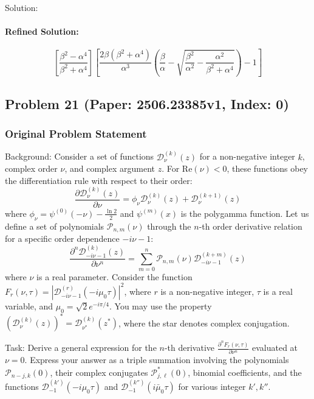 \documentclass[10pt]{article}
\begin{document}
Solution:

\paragraph*{Refined Solution:}
\[ \left[\frac{\beta^2 - \alpha^4}{\beta^2 + \alpha^4}\right] \left[ \frac{2\beta(\beta^2 + \alpha^4)}{\alpha^3}\left(\frac{\beta}{\alpha} - \sqrt{\frac{\beta^2}{\alpha^2} - \frac{\alpha^2}{\beta^2 + \alpha^4}} \right) - 1\right] \]

\newpage
\subsection*{Problem 21 (Paper: 2506.23385v1, Index: 0)}

\subsubsection*{Original Problem Statement}
Background:
Consider a set of functions $\mathcal{D}^{\left(k\right)}_{\nu}\left(z\right)$ for a non-negative integer $k$, complex order $\nu$, and complex argument $z$. For $\mathrm{Re}(\nu) < 0$, these functions obey the differentiation rule with respect to their order:
$$ \frac{\partial \mathcal{D}^{\left(k\right)}_{\nu}\left(z\right)}{\partial \nu}=\phi_{\nu}\mathcal{D}^{\left(k\right)}_{\nu}\left(z\right)+\mathcal{D}^{\left(k+1\right)}_{\nu}\left(z\right) $$
where $\phi_{\nu}=\psi^{\left(0\right)}\left(-\nu\right)-\frac{\ln 2}{2}$ and $\psi^{(m)}(x)$ is the polygamma function. Let us define a set of polynomials $\mathcal{P}_{n,m}(\nu)$ through the $n$-th order derivative relation for a specific order dependence $-i\nu-1$:
$$ \frac{\partial^n \mathcal{D}^{\left(k\right)}_{-i\nu-1}\left(z\right)}{\partial \nu^n}=\sum_{m=0}^{n}\mathcal{P}_{n,m}\left(\nu\right)\mathcal{D}^{\left(k+m\right)}_{-i\nu-1}\left(z\right) $$
where $\nu$ is a real parameter. Consider the function $F_{r}(\nu, \tau) = \left|\mathcal{D}^{\left(r\right)}_{-i\nu-1}\left(-i\mu_0\tau\right)\right|^2$, where $r$ is a non-negative integer, $\tau$ is a real variable, and $\mu_0 = \sqrt{2}e^{-i\pi/4}$. You may use the property $(\mathcal{D}^{(k)}_{\nu}(z))^* = \mathcal{D}^{(k)}_{\nu^*}(z^*)$, where the star denotes complex conjugation.

Task:
Derive a general expression for the $n$-th derivative $\frac{\partial^n F_{r}(\nu, \tau)}{\partial \nu^n}$ evaluated at $\nu=0$. Express your answer as a triple summation involving the polynomials $\mathcal{P}_{n-j,k}(0)$, their complex conjugates $\mathcal{P}^*_{j,\ell}(0)$, binomial coefficients, and the functions $\mathcal{D}^{(k')}_{-1}(-i\mu_0\tau)$ and $\mathcal{D}^{(k'')}_{-1}(i\bar{\mu}_0\tau)$ for various integer $k', k''$.
\end{document}
